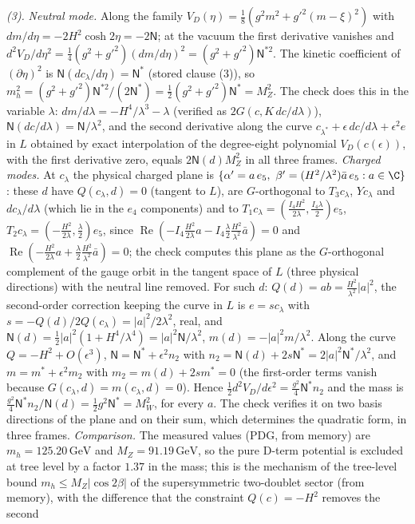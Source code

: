 \emph{(3).} \emph{Neutral mode.} Along the family $V_{D}(\eta) = \tfrac18(g^{2}m^{2} + g'^{2}(m - \xi)^{2})$ with $dm/d\eta = -2H^{2}\cosh 2\eta = -2\mathsf{N}$; at the vacuum the first derivative vanishes and $d^{2}V_{D}/d\eta^{2} = \tfrac14(g^{2} + g'^{2})(dm/d\eta)^{2} = (g^{2} + g'^{2})\mathsf{N}^{*2}$. The kinetic coefficient of $(\partial\eta)^{2}$ is $\mathsf{N}(dc_{\lambda}/d\eta) = \mathsf{N}^{*}$ (stored clause (3)), so $m_{h}^{2} = (g^{2} + g'^{2})\mathsf{N}^{*2}/(2\mathsf{N}^{*}) = \tfrac12(g^{2} + g'^{2})\mathsf{N}^{*} = M_{Z}^{2}$. The check does this in the variable $\lambda$: $dm/d\lambda = -H^{4}/\lambda^{3} - \lambda$ (verified as $2G(c, K\,dc/d\lambda)$), $\mathsf{N}(dc/d\lambda) = \mathsf{N}/\lambda^{2}$, and the second derivative along the curve $c_{\lambda^{*}} + \epsilon\,dc/d\lambda + \epsilon^{2}e$ in $L$ obtained by exact interpolation of the degree-eight polynomial $V_{D}(c(\epsilon))$, with the first derivative zero, equals $2\mathsf{N}(d)M_{Z}^{2}$ in all three frames. \emph{Charged modes.} At $c_{\lambda}$ the physical charged plane is $\{\alpha' = a\,e_{5},\ \beta' = (H^{2}/\lambda^{2})\bar{a}\,e_{5} : a \in \C\}$: these $d$ have $Q(c_{\lambda}, d) = 0$ (tangent to $L$), are $G$-orthogonal to $T_{3}c_{\lambda}$, $Yc_{\lambda}$ and $dc_{\lambda}/d\lambda$ (which lie in the $e_{4}$ components) and to $T_{1}c_{\lambda} = (\tfrac{I_{4}H^{2}}{2\lambda}, \tfrac{I_{4}\lambda}{2})e_{5}$, $T_{2}c_{\lambda} = (-\tfrac{H^{2}}{2\lambda}, \tfrac{\lambda}{2})e_{5}$, since $\operatorname{Re}(-I_{4}\tfrac{H^{2}}{2\lambda}a - I_{4}\tfrac{\lambda}{2}\tfrac{H^{2}}{\lambda^{2}}\bar{a}) = 0$ and $\operatorname{Re}(-\tfrac{H^{2}}{2\lambda}a + \tfrac{\lambda}{2}\tfrac{H^{2}}{\lambda^{2}}\bar{a}) = 0$; the check computes this plane as the $G$-orthogonal complement of the gauge orbit in the tangent space of $L$ (three physical directions) with the neutral line removed. For such $d$: $Q(d) = ab = \tfrac{H^{2}}{\lambda^{2}}|a|^{2}$, the second-order correction keeping the curve in $L$ is $e = sc_{\lambda}$ with $s = -Q(d)/2Q(c_{\lambda}) = |a|^{2}/2\lambda^{2}$, real, and $\mathsf{N}(d) = \tfrac12|a|^{2}(1 + H^{4}/\lambda^{4}) = |a|^{2}\mathsf{N}/\lambda^{2}$, $m(d) = -|a|^{2}m/\lambda^{2}$. Along the curve $Q = -H^{2} + O(\epsilon^{3})$, $\mathsf{N} = \mathsf{N}^{*} + \epsilon^{2}n_{2}$ with $n_{2} = \mathsf{N}(d) + 2s\mathsf{N}^{*} = 2|a|^{2}\mathsf{N}^{*}/\lambda^{2}$, and $m = m^{*} + \epsilon^{2}m_{2}$ with $m_{2} = m(d) + 2sm^{*} = 0$ (the first-order terms vanish because $G(c_{\lambda}, d) = m(c_{\lambda}, d) = 0$). Hence $\tfrac12 d^{2}V_{D}/d\epsilon^{2} = \tfrac{g^{2}}{4}\mathsf{N}^{*}n_{2}$ and the mass is $\tfrac{g^{2}}{4}\mathsf{N}^{*}n_{2}/\mathsf{N}(d) = \tfrac12 g^{2}\mathsf{N}^{*} = M_{W}^{2}$, for every $a$. The check verifies it on two basis directions of the plane and on their sum, which determines the quadratic form, in three frames. \emph{Comparison.} The measured values (PDG, from memory) are $m_{h} = 125.20\,\mathrm{GeV}$ and $M_{Z} = 91.19\,\mathrm{GeV}$, so the pure D-term potential is excluded at tree level by a factor $1.37$ in the mass; this is the mechanism of the tree-level bound $m_{h} \le M_{Z}|\cos 2\beta|$ of the supersymmetric two-doublet sector (from memory), with the difference that the constraint $Q(c) = -H^{2}$ removes the second 